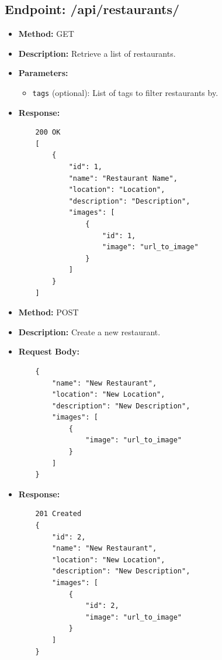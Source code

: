 \subsection{Endpoint: /api/restaurants/}

\begin{itemize}
    \item \textbf{Method:} GET
    \item \textbf{Description:} Retrieve a list of restaurants.
    \item \textbf{Parameters:}
    \begin{itemize}
        \item \texttt{tags} (optional): List of tags to filter restaurants by.
    \end{itemize}
    \item \textbf{Response:}
    \begin{verbatim}
    200 OK
    [
        {
            "id": 1,
            "name": "Restaurant Name",
            "location": "Location",
            "description": "Description",
            "images": [
                {
                    "id": 1,
                    "image": "url_to_image"
                }
            ]
        }
    ]
    \end{verbatim}
    \item \textbf{Method:} POST
    \item \textbf{Description:} Create a new restaurant.
    \item \textbf{Request Body:}
    \begin{verbatim}
    {
        "name": "New Restaurant",
        "location": "New Location",
        "description": "New Description",
        "images": [
            {
                "image": "url_to_image"
            }
        ]
    }
    \end{verbatim}
    \item \textbf{Response:}
    \begin{verbatim}
    201 Created
    {
        "id": 2,
        "name": "New Restaurant",
        "location": "New Location",
        "description": "New Description",
        "images": [
            {
                "id": 2,
                "image": "url_to_image"
            }
        ]
    }
    \end{verbatim}
\end{itemize}

